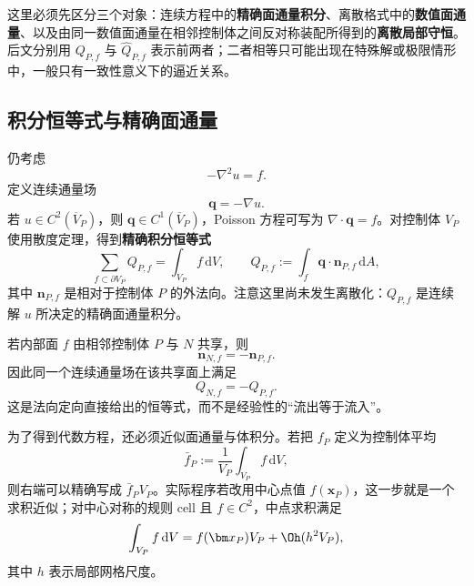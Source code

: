 这里必须先区分三个对象：连续方程中的\textbf{精确面通量积分}、离散格式中的\textbf{数值面通量}、以及由同一数值面通量在相邻控制体之间反对称装配所得到的\textbf{离散局部守恒}。后文分别用 $Q_{P,f}$ 与 $\widehat Q_{P,f}$ 表示前两者；二者相等只可能出现在特殊解或极限情形中，一般只有一致性意义下的逼近关系。

\subsection{积分恒等式与精确面通量}

仍考虑
\begin{equation}
-\nabla^2u=f.
\label{eq:discretization-poisson-fv-start}
\end{equation}
定义连续通量场
\begin{equation}
\bm q=-\nabla u.
\label{eq:discretization-poisson-flux}
\end{equation}
若 $u\in C^2(\overline V_P)$，则 $\bm q\in C^1(\overline V_P)$，Poisson 方程可写为 $\nabla\cdot\bm q=f$。对控制体 $V_P$ 使用散度定理，得到\textbf{精确积分恒等式}
\begin{equation}
\sum_{f\subset\partial V_P}Q_{P,f}
=
\int_{V_P} f\,\mathrm dV,
\qquad
Q_{P,f}:=\int_f \bm q\cdot\bm n_{P,f}\,\mathrm dA,
\label{eq:discretization-fv-poisson-balance}
\end{equation}
其中 $\bm n_{P,f}$ 是相对于控制体 $P$ 的外法向。注意这里尚未发生离散化：$Q_{P,f}$ 是连续解 $u$ 所决定的精确面通量积分。

若内部面 $f$ 由相邻控制体 $P$ 与 $N$ 共享，则
\begin{equation}
\bm n_{N,f}=-\bm n_{P,f}.
\end{equation}
因此同一个连续通量场在该共享面上满足
\begin{equation}
\boxed{Q_{N,f}=-Q_{P,f}.}
\label{eq:discretization-exact-flux-antisymmetry}
\end{equation}
这是法向定向直接给出的恒等式，而不是经验性的“流出等于流入”。

为了得到代数方程，还必须近似面通量与体积分。若把 $f_P$ 定义为控制体平均
\begin{equation}
\bar f_P:=\frac1{V_P}\int_{V_P}f\,\mathrm dV,
\end{equation}
则右端可以精确写成 $\bar f_PV_P$。实际程序若改用中心点值 $f(\bm x_P)$，这一步就是一个求积近似；对中心对称的规则 cell 且 $f\in C^2$，中点求积满足
\begin{equation}
\int_{V_P}f\,\mathrm dV
=f(\bm x_P)V_P+\Oh(h^2V_P),
\label{eq:discretization-fv-source-quadrature}
\end{equation}
其中 $h$ 表示局部网格尺度。

